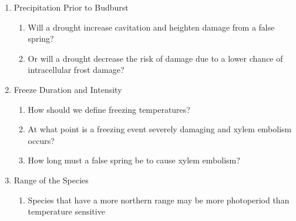 \documentclass{article}\usepackage[]{graphicx}\usepackage[]{color}
\begin{document}
\begin{siderules}
\begin{enumerate}
\begin{enumerate}
  \end{enumerate}
  \item Precipitation Prior to Budburst \citep{Anderegg2013}
  \begin{enumerate}
    \item Will a drought increase cavitation and heighten damage from a false spring?
    \item Or will a drought decrease the risk of damage due to a lower chance of intracellular frost damage?
  \end{enumerate}
  \item Freeze Duration and Intensity
  \begin{enumerate}
    \item How should we define freezing temperatures?
    \item At what point is a freezing event severely damaging and xylem embolism occurs?
    \item How long must a false spring be to cause xylem embolism?
  \end{enumerate}
  \item Range of the Species
  \begin{enumerate}
    \item Species that have a more northern range may be more photoperiod than temperature sensitive 
  \end{enumerate}
\end{enumerate}
\end{siderules}


\end{document}
